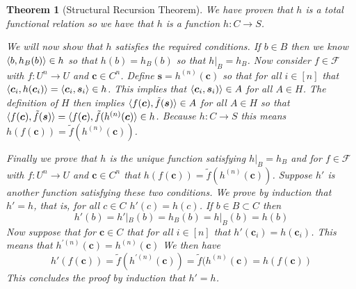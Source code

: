 \documentclass[12pt]{article}
\theoremstyle{break}
\theoremstyle{break}
\newtheorem{theorem}{Theorem}[section]
\theoremstyle{break}
\theoremstyle{break}
\theoremstyle{break}
\newtheorem{informal definition}[definition]{Informal Definition}
\newcommand{\bv}[1]{\boldsymbol{#1}}
\begin{document}
\begin{theorem}[Structural Recursion Theorem]
We have proven that $h$ is a total functional relation so we have that $h$ is a function $h:C\to S$.

We will now show that $h$ satisfies the required conditions.
If $b\in B$ then we know $\braket{b, h_B(b)} \in h$ so that $h(b) = h_B(b)$ so that $h|_B = h_B$.
Now consider $f\in \mathcal{F}$ with $f:U^n \to U$ and $\bv{c} \in C^n$.
Define $\bv{s} = h^{(n)}(\bv{c})$ so that for all $i \in [n]$ that $\braket{\bv{c}_i, h(\bv{c}_i)} = \braket{\bv{c}_i, \bv{s}_i} \in h$.
This implies that $\braket{\bv{c}_i, \bv{s}_i)} \in A$ for all $A\in H$.
The definition of $H$ then implies $\braket{f(\bv{c}), \tilde{f}(\bv{s})} \in A$ for all $A\in H$ so that $\braket{f(\bv{c}), \tilde{f}(\bv{s})} = \braket{f(\bv{c}), \tilde{f}(h^{(n)}(\bv{c})} \in h$.
Because $h:C \to S$ this means $h(f(\bv{c})) = \tilde{f}(h^{(n)}(\bv{c}))$.

Finally we prove that $h$ is the unique function satisfying $h|_B = h_B$ and for $f\in \mathcal{F}$ with $f:U^n \to U$ and $\bv{c}\in C^n$ that $h(f(\bv{c})) = \tilde{f}(h^{(n)}(\bv{c}))$.
Suppose $h'$ is another function satisfying these two conditions.
We prove by induction that $h' = h$, that is, for all $c\in C$ $h'(c) = h(c)$.
If $b\in B \subset C$ then
$$
h'(b) = h'|_B(b) = h_B(b) = h|_B(b) = h(b)
$$
Now suppose that for $\bv{c} \in C$ that for all $i\in [n]$ that $h'(\bv{c}_i) = h(\bv{c}_i)$.
This means that $h^{'(n)}(\bv{c}) = h^{(n)}(\bv{c})$
We then have
$$
h'(f(\bv{c})) = \tilde{f}(h^{'(n)}(\bv{c})) = \tilde{f}(h^{(n)}(\bv{c}) = h(f(\bv{c}))
$$
This concludes the proof by induction that $h'=h$.


\end{theorem}
\end{document}
